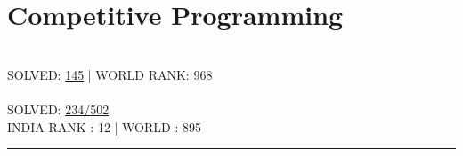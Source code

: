 \documentclass[letterpaper]{Formatting}
\begin{document}
\begin{minipage}[t]{0.3\textwidth}
\section{Competitive Programming}
\\\vspace{0.5ex}
\small\uppercase {Solved: }\href{http://www.spoj.com/users/rbavishi/}{145} | \uppercase{World Rank: 968}\\
\vspace{2ex}
\\\vspace{0.5ex}
\small \uppercase{Solved: }\href{https://projecteuler.net/profile/RJBavishi.png}{234/502} \\
\small \uppercase{India Rank : 12 | World : 895}
\vspace{1ex}
\rule{5cm}{0.5pt}
\vspace{2ex}


\end{minipage} %
\hfill
\vrule
\hspace{3ex}
%
%
\end{document}
